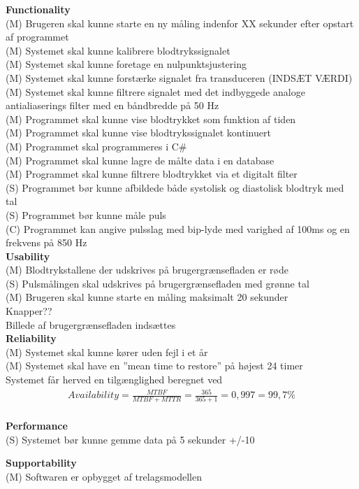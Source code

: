 \textbf{Functionality}\\
(M) Brugeren skal kunne starte en ny måling indenfor XX sekunder efter opstart af programmet \\
(M) Systemet skal kunne kalibrere blodtrykssignalet\\
(M) Systemet skal kunne foretage en nulpunktsjustering\\
(M) Systemet skal kunne forstærke signalet fra transduceren (INDSÆT VÆRDI)\\
(M) Systemet skal kunne filtrere signalet med det indbyggede analoge antialiaserings filter med en båndbredde på 50 Hz \\
(M) Programmet skal kunne vise blodtrykket som funktion af tiden\\
(M) Programmet skal kunne vise blodtrykssignalet kontinuert\\
(M) Programmet skal programmeres i C\#\\
(M) Programmet skal kunne lagre de målte data i en database\\
(M) Programmet skal kunne filtrere blodtrykket via et digitalt filter\\
(S) Programmet bør kunne afbildede både systolisk og diastolisk blodtryk med tal\\
(S) Programmet bør kunne måle puls\\
(C) Programmet kan angive pulsslag med bip-lyde med varighed af 100ms og en frekvens på 850 Hz\\

\textbf{Usability}\\
(M) Blodtrykstallene der udskrives på brugergrænsefladen er røde\\
(S) Pulsmålingen skal udskrives på brugergrænsefladen med grønne tal\\
(M) Brugeren skal kunne starte en måling maksimalt 20 sekunder\\
Knapper??\\
Billede af brugergrænsefladen indsættes\\

\textbf{Reliability}\\
(M) Systemet skal kunne kører uden fejl i et år\\
(M) Systemet skal have en ”mean time to restore” på højest 24 timer\\
Systemet får herved en tilgænglighed beregnet ved \begin{align}
Availability = \frac{MTBF}{MTBF+MTTR} = \frac{365}{365+1} = 0,997 = 99,7 \%
\end{align}\\

\textbf{Performance}\\
(S) Systemet bør kunne gemme data på 5 sekunder +/-10%

\textbf{Supportability}\\
(M) Softwaren er opbygget af trelagsmodellen\\




















